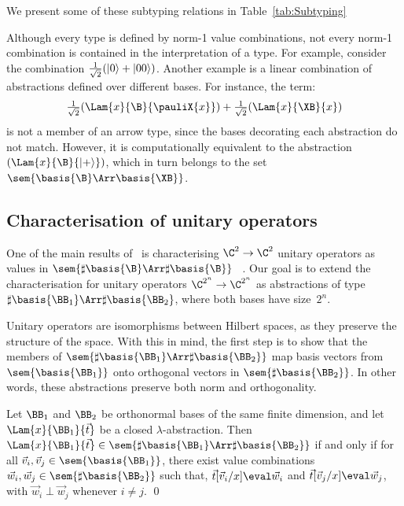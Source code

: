 We present some of these subtyping relations in Table~\ref{tab:Subtyping}

Although every type is defined by norm-1 value combinations, not every
norm-1 combination is contained in the interpretation of a type.
For example, consider the combination
$\tfrac{1}{\sqrt{2}}(\left\vert{0}\right\rangle + \left\vert{00}\right\rangle)$.
Another example is a linear combination of abstractions defined over different
bases. For instance, the term:
\[
  \tfrac{1}{\sqrt{2}}(\Lam{x}{{\B}}{\pauliX{x}})
  + \tfrac{1}{\sqrt{2}}(\Lam{x}{{\XB}}{x})
\]
is not a member of an arrow type, since the bases decorating each abstraction
do not match. However, it is computationally equivalent to the abstraction
$(\Lam{x}{{\B}}{\ket{+}})$, which in turn belongs to the set
$\sem{\basis{\B}\Arr\basis{\XB}}$.

\subsection{Characterisation of unitary operators}

One of the main results of~\cite{DiazcaroGuillermoMiquelValironLICS19}
is characterising $\C^2\to\C^2$ unitary operators as values in
$\sem{\sharp\basis{\B}\Arr\sharp\basis{\B}}$~
\cite[Theorem IV.12]{DiazcaroGuillermoMiquelValironLICS19}.
Our goal is to extend the characterisation for unitary operators
$\C^{2^n}\to\C^{2^n}$ as abstractions of type $\sharp\basis{\BB_1}
\Arr\sharp\basis{\BB_2}$, where both bases have size~$2^n$.

Unitary operators are isomorphisms between Hilbert spaces, as they preserve the
structure of the space. With this in mind, the first step is to show that the
members of $\sem{\sharp\basis{\BB_1}\Arr\sharp\basis{\BB_2}}$ map basis vectors
from $\sem{\basis{\BB_1}}$ onto orthogonal vectors in $\sem{\sharp\basis{\BB_2}}$. In other
words, these abstractions preserve both norm and orthogonality.

\begin{lemma}\label{lem:BasesIso}
  Let $\BB_1$ and $\BB_2$ be orthonormal bases of the same finite
  dimension, and let $\Lam{x}{{\BB_1}}{\vec t}$ be a closed $\lambda$-abstraction.
  Then $\Lam{x}{{\BB_1}}{\vec t}\in\sem{\sharp\basis{\BB_1}\Arr\sharp\basis{\BB_2}}$
  if and only if 
  for all $\vec{v}_{i},\vec{v}_{j}\in\sem{\basis{\BB_1}}$,
  there exist value combinations
  $\vec{w}_{i},\vec{w}_{j}\in\sem{\sharp\basis{\BB_2}}$ such that,
    $\vec{t}[\vec{v}_{i}/x]\eval\vec{w}_{i}$
    and
    $\vec{t}[\vec{v}_{j}/x]\eval\vec{w}_{j}$,
    with
    $\vec{w}_{i}\perp\vec{w}_{j}$ whenever $i\neq j$.
    \qed
\end{lemma}

